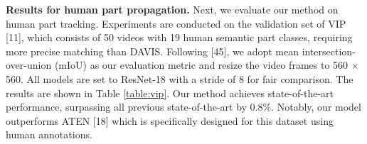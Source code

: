 \documentclass{article}
\begin{document}
\textbf{Results for human part propagation.} Next, we evaluate our method on human part tracking. Experiments are conducted on the validation set of VIP [11], which consists of 50 videos with 19 human semantic part classes, requiring more precise matching than DAVIS. Following [45], we adopt mean intersection-over-union (mIoU) as our evaluation metric and resize the video frames to 560 $\times$ 560. All models are set to ResNet-18 with a stride of 8 for fair comparison.  The results are shown in Table \ref{table:vip}. Our method achieves state-of-the-art performance, surpassing all previous state-of-the-art by 0.8\%. Notably, our model outperforms ATEN [18] which is specifically designed for this dataset using human annotations.

  
\begin{table}
	\centering
	\small
	\captionsetup{font=small}
	\caption{\textbf{Quantitative results for human part propagation and human pose tracking.} We show results of state-of-the-art self-supervised methods and some \textcolor{gray}{supervised} methods for comparison.}
	\label{table:vip}
	\vspace{-5pt}
\end{table}
\end{document}
